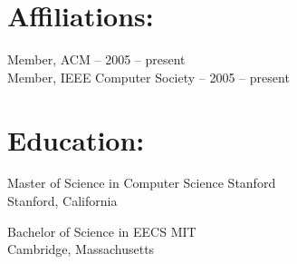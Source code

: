 \documentclass{resume}
\begin{document}
\section*{Affiliations:}
Member, ACM -- 2005 -- present\\
Member, IEEE Computer Society -- 2005 -- present

\section*{Education:}

    {Master of Science in Computer Science}
    {Stanford}
    {}\\
    Stanford, California

    {Bachelor of Science in EECS}
    {MIT}
    {}\\
    Cambridge, Massachusetts
\end{document}
